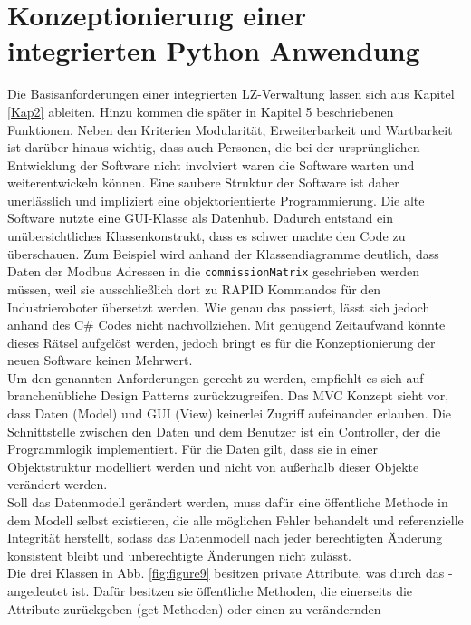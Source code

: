 

\chapter{Konzeptionierung einer integrierten Python Anwendung}\label{PythonApp}

Die Basisanforderungen einer integrierten LZ-Verwaltung lassen sich aus Kapitel \ref{Kap2} ableiten.
Hinzu kommen die später in Kapitel 5 beschriebenen Funktionen.
Neben den Kriterien Modularität, Erweiterbarkeit und Wartbarkeit ist darüber hinaus wichtig, dass auch Personen,
die bei der ursprünglichen Entwicklung der Software nicht involviert waren die Software warten und weiterentwickeln können.
Eine saubere Struktur der Software ist daher unerlässlich und impliziert eine objektorientierte Programmierung.
Die alte Software nutzte eine GUI-Klasse als Datenhub.
Dadurch entstand ein unübersichtliches Klassenkonstrukt, dass es schwer machte den Code zu überschauen.
Zum Beispiel wird anhand der Klassendiagramme deutlich, dass Daten der Modbus Adressen in die \verb|commissionMatrix|
geschrieben werden müssen, weil sie ausschließlich dort zu RAPID Kommandos für den Industrieroboter übersetzt werden.
Wie genau das passiert, lässt sich jedoch anhand des C\# Codes nicht nachvollziehen.
Mit genügend Zeitaufwand könnte dieses Rätsel aufgelöst werden, jedoch bringt es für die Konzeptionierung der neuen
Software keinen Mehrwert.\\
\vspace{1cm}
Um den genannten Anforderungen gerecht zu werden, empfiehlt es sich auf branchenübliche Design Patterns
zurückzugreifen.
Das MVC Konzept sieht vor, dass Daten (Model) und GUI (View) keinerlei Zugriff aufeinander erlauben.
Die Schnittstelle zwischen den Daten und dem Benutzer ist ein Controller, der die Programmlogik implementiert.
Für die Daten gilt, dass sie in einer Objektstruktur modelliert werden und nicht von außerhalb dieser Objekte verändert
werden.\\
\vspace{1cm}
Soll das Datenmodell gerändert werden, muss dafür eine öffentliche Methode in dem Modell selbst existieren,
die alle möglichen Fehler behandelt und referenzielle Integrität herstellt, sodass das Datenmodell nach jeder berechtigten
Änderung konsistent bleibt und unberechtigte Änderungen nicht zulässt.\\
Die drei Klassen in Abb. \ref{fig:figure9} besitzen private Attribute, was durch das \glqq - \grqq angedeutet ist.
Dafür besitzen sie öffentliche Methoden, die einerseits die Attribute zurückgeben (get-Methoden) oder einen zu verändernden
